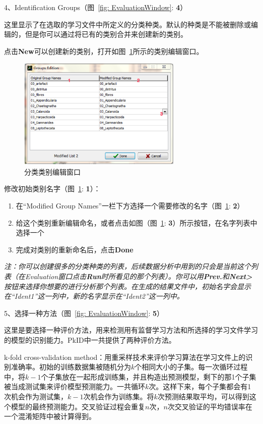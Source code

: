 \documentclass[12pt]{article}
\begin{document}
4、Identification Groups（图~\ref{fig: EvaluationWindow}: {\color{red}\textbf{4}}）

这里显示了在选取的学习文件中所定义的分类种类。默认的种类是不能被删除或编辑的，但是你可以通过将已有的类别合并来创建新的类别。

点击\textbf{New}可以创建新的类别，打开如图~\ref{fig: GroupsEditionWindow}所示的类别编辑窗口。

\begin{figure}[!ht]
\centering
\includegraphics[width=0.7\textwidth]{GroupsEditionWindow.eps}
\caption{分类类别编辑窗口}
\label{fig: GroupsEditionWindow}
\end{figure}

修改初始类别名字（图~\ref{fig: GroupsEditionWindow}: {\color{red}\textbf{1}}）：
\begin{enumerate}
\item 在“Modified Group Names”一栏下方选择一个需要修改的名字（图~\ref{fig: GroupsEditionWindow}: {\color{red}\textbf{2}}）
\item 给这个类别重新编辑命名，或者点击如图（图~\ref{fig: GroupsEditionWindow}: {\color{red}\textbf{3}}）所示按钮，在名字列表中选择一个
\item 完成对类别的重新命名后，点击\textbf{Done}
\end{enumerate}
{\color{blue}\textit{注：你可以创建很多的分类种类的列表，后续数据分析中用到的只会是当前这个列表（在Evaluation窗口点击\textbf{Run}时所看见的那个列表）。你可以用\textbf{Prev.}和\textbf{Next>}按钮来选择你想要的进行分析那个列表。在生成的结果文件中，初始名字会显示在“Ident1”这一列中，新的名字显示在“Ident2”这一列中。}}

5、选择一种方法（图~\ref{fig: EvaluationWindow}: {\color{red}\textbf{5}}）

这里是要选择一种评价方法，用来检测用有监督学习方法和所选择的学习文件学习的模型的识别能力。PkID中一共提供了两种评价方法。

{\color{red}k-fold cross-validation method}：用重采样技术来评价学习算法在学习文件上的识别准确率。初始的训练数据集被随机分为$k$个相同大小的子集。每一次循环过程中，将$k-1$个子集放在一起形成训练集，并且构造出预测模型，剩下的那1个子集被当成测试集来评价模型预测能力。一共循环$k$次。这样下来，每个子集都会有1次机会作为测试集，$k-1$次机会作为训练集。将$k$次预测结果取平均，可以得到这个模型的最终预测能力。交叉验证过程会重复$n$次，$n$次交叉验证的平均错误率在一个混淆矩阵中被计算得到。
\end{document}
